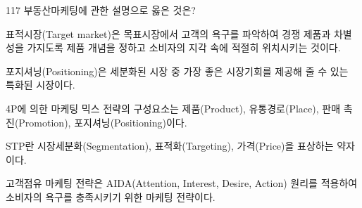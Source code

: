 \begin{question}{117}
부동산마케팅에 관한 설명으로 옳은 것은?
\begin{choices}
  \item 표적시장(Target market)은 목표시장에서 고객의 욕구를 파악하여 경쟁 제품과 차별성을 가지도록 제품 개념을 정하고 소비자의 지각 속에 적절히 위치시키는 것이다.
  \item 포지셔닝(Positioning)은 세분화된 시장 중 가장 좋은 시장기회를 제공해 줄 수 있는 특화된 시장이다.
  \item 4P에 의한 마케팅 믹스 전략의 구성요소는 제품(Product), 유통경로(Place), 판매 촉진(Promotion), 포지셔닝(Positioning)이다.
  \item STP란 시장세분화(Segmentation), 표적화(Targeting), 가격(Price)을 표상하는 약자이다.
  \item 고객점유 마케팅 전략은 AIDA(Attention, Interest, Desire, Action) 원리를 적용하여 소비자의 욕구를 충족시키기 위한 마케팅 전략이다.
\end{choices}
\end{question}

